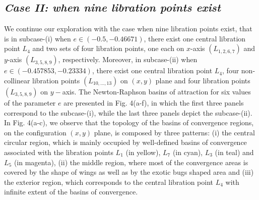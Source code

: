 \documentclass[preprint,fleqn,5p,numbers,sort&compress]{elsarticle}
\begin{document}
\subsection{\emph{Case II: when nine libration points exist}}
\label{sec:402}
We continue our exploration with the case when nine libration points exist, \textcolor[rgb]{0.00,0.00,0.00}{that is in subcase}-(i) when $e\in (-0.5, -0.46671)$,  there exist one central libration point $L_4$ and two sets of four libration points, one each on $x$-axis $(L_{1,2,6,7})$ and $y$-axis $(L_{3,5,8,9})$, respectively. Moreover, in subcase-(ii) when $e\in (-0.457853, -0.23334)$, there exist one central libration point $L_4$,   four non-collinear libration points $(L_{10,...,13})$ on $(x,y)$ plane and four libration points $(L_{3,5,8,9})$ on $y-$axis. The Newton-Raphson basins of attraction for six values of the parameter $e$ are presented in Fig. \textcolor[rgb]{1.00,0.00,0.50}{4}(a-f), in which the first three panels correspond to the subcase-(i), while the last three panels depict the subcase-(ii).\\
In Fig. \textcolor[rgb]{1.00,0.00,0.50}{4}(a-c), we observe that the topology of the basins of convergence regions, on the configuration $(x,y)$ plane, is composed by three patterns: (i) the central circular region, which is mainly occupied by well-defined basins of convergence associated with the libration points $L_1$ (in yellow), $L_7$ (in cyan), $L_3$ (in teal) and $L_5$ (in magenta), (ii) the middle region, where most of the convergence areas is covered by the shape of wings as well as by the exotic bugs shaped area and (iii) the exterior region,  which corresponds to the central libration point $L_4$ with infinite extent of the basins of convergence.
\end{document}
